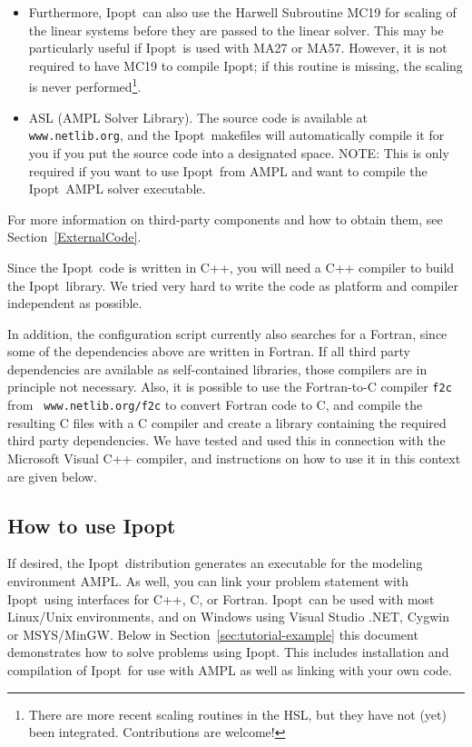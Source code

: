 \documentclass[10pt]{article}
\newcommand{\Ipopt}{{\sc Ipopt}}
\begin{document}
\begin{itemize}
  If you are compiling MA57 or MUMPS within the \Ipopt\ build system,
  you should also include the METIS linear system ordering package.

  Interfaces to other linear solvers might be added in the future; if
  you are interested in contributing such an interface please contact
  us!  Note that \Ipopt\ requires that the linear solver is able to
  provide the inertia (number of positive and negative eigenvalues) of
  the symmetric matrix that is factorized.

\item Furthermore, \Ipopt\ can also use the Harwell Subroutine MC19
  for scaling of the linear systems before they are passed to the
  linear solver.  This may be particularly useful if \Ipopt\ is used
  with MA27 or MA57.  However, it is not required to have MC19 to
  compile \Ipopt; if this routine is missing, the scaling is never
  performed\footnote{There are more recent scaling routines in the
    HSL, but they have not (yet) been integrated.  Contributions are
    welcome!}.
\item ASL (AMPL Solver Library).  The source code is available at {\tt
    www.netlib.org}, and the \Ipopt\ makefiles will automatically
  compile it for you if you put the source code into a designated
  space.  NOTE: This is only required if you want to use \Ipopt\ from
  AMPL and want to compile the \Ipopt\ AMPL solver executable.
\end{itemize}
For more information on third-party components and how to obtain them,
see Section~\ref{ExternalCode}.

Since the \Ipopt\ code is written in C++, you will need a C++ compiler
to build the \Ipopt\ library.  We tried very hard to write the code as
platform and compiler independent as possible.

In addition, the configuration script currently also searches for a
Fortran, since some of the dependencies above are written in Fortran.
If all third party dependencies are available as self-contained
libraries, those compilers are in principle not necessary.  Also, it
is possible to use the Fortran-to-C compiler {\tt f2c} from {\tt
  www.netlib.org/f2c} to convert Fortran code to C, and compile the
resulting C files with a C compiler and create a library containing
the required third party dependencies.  We have tested and used this
in connection with the Microsoft Visual C++ compiler, and instructions
on how to use it in this context are given below.

\subsection{How to use \Ipopt}
If desired, the \Ipopt\ distribution generates an executable for the
modeling environment AMPL. As well, you can link your problem
statement with \Ipopt\ using interfaces for C++, C, or Fortran.
\Ipopt\ can be used with most Linux/Unix environments, and on Windows
using Visual Studio .NET, Cygwin or MSYS/MinGW.  Below in
Section~\ref{sec:tutorial-example} this document demonstrates how to
solve problems using \Ipopt. This includes installation and
compilation of \Ipopt\ for use with AMPL as well as linking with your
own code.
\end{document}
